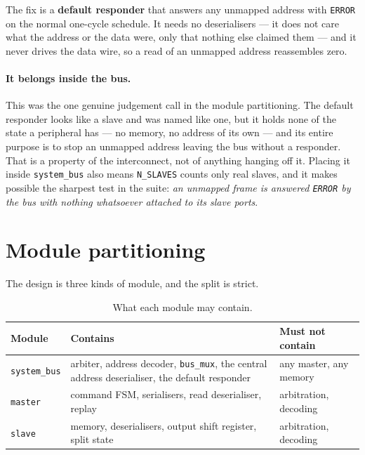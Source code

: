 \documentclass[11pt,a4paper]{article}
\newcommand{\sig}[1]{\texttt{#1}}
\begin{document}
The fix is a \textbf{default responder} that answers any unmapped address
with \sig{ERROR} on the normal one-cycle schedule. It needs no
deserialisers --- it does not care what the address or the data were, only
that nothing else claimed them --- and it never drives the data wire, so a
read of an unmapped address reassembles zero.

\paragraph{It belongs inside the bus.} This was the one genuine judgement
call in the module partitioning. The default responder looks like a slave and
was named like one, but it holds none of the state a peripheral has --- no
memory, no address of its own --- and its entire purpose is to stop an
unmapped address leaving the bus without a responder. That is a property of
the interconnect, not of anything hanging off it. Placing it inside
\sig{system\_bus} also means \sig{N\_SLAVES} counts only real slaves, and it
makes possible the sharpest test in the suite: \emph{an unmapped frame is
answered \sig{ERROR} by the bus with nothing whatsoever attached to its slave
ports}.

\section{Module partitioning}

The design is three kinds of module, and the split is strict.

\begin{table}[htb]
\centering\small
\caption{What each module may contain.}
\begin{tabularx}{\textwidth}{@{}lXl@{}}
\toprule
\textbf{Module} & \textbf{Contains} & \textbf{Must not contain}\\
\midrule
\sig{system\_bus} & arbiter, address decoder, \sig{bus\_mux}, the central
address deserialiser, the default responder & any master, any memory\\
\addlinespace
\sig{master} & command FSM, serialisers, read deserialiser, replay &
arbitration, decoding\\
\addlinespace
\sig{slave} & memory, deserialisers, output shift register, split state &
arbitration, decoding\\
\bottomrule
\end{tabularx}
\end{table}
\end{document}
